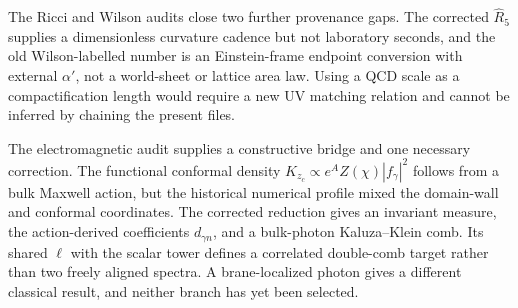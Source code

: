 \documentclass[10pt]{article}
\begin{document}
The Ricci and Wilson audits close two further provenance gaps.  The corrected
$\widehat R_5$ supplies a dimensionless curvature cadence but not laboratory
seconds, and the old Wilson-labelled number is an Einstein-frame endpoint
conversion with external $\alpha'$, not a world-sheet or lattice area law.
Using a QCD scale as a compactification length would require a new UV matching
relation and cannot be inferred by chaining the present files.

The electromagnetic audit supplies a constructive bridge and one necessary
correction.  The functional conformal density
$K_{z_c}\propto e^A Z(\chi)|f_\gamma|^2$ follows from a bulk Maxwell action,
but the historical numerical profile mixed the domain-wall and conformal
coordinates.  The corrected reduction gives an invariant measure, the
action-derived coefficients $d_{\gamma n}$, and a bulk-photon Kaluza--Klein
comb.  Its shared $\ell$ with the scalar tower defines a correlated double-comb
target rather than two freely aligned spectra.  A brane-localized photon gives
a different classical result, and neither branch has yet been selected.
\end{document}
